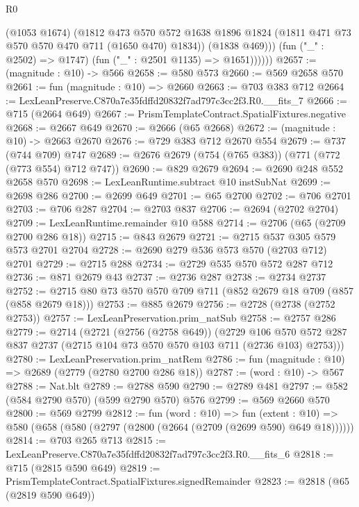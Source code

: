 \begin{lexlean}{R0}
\begin{coremodule}
                  (@1053 @1674)
                  (@1812
                    @473
                    @570
                    @572
                    @1638
                    @1896
                    @1824
                    (@1811 @471 @73 @570 @570 @470 @711 (@1650 @470) @1834))
                  (@1838 @469)))
              (fun ("_" : @2502) => @1747)
              (fun ("_" : @2501 @1135) => @1651))))))
@2657 := (magnitude : @10) -> @566
@2658 := @580 @573
@2660 := @569 @2658 @570
@2661 := fun (magnitude : @10) => @2660
@2663 := @703 @383 @712
@2664 := LexLeanPreserve.C870a7e35fdffd20832f7ad797c3cc2f3.R0.__fits_7
@2666 := @715 (@2664 @649)
@2667 := PrismTemplateContract.SpatialFixtures.negative
@2668 := @2667 @649
@2670 := @2666 (@65 @2668)
@2672 := (magnitude : @10) -> @2663 @2670
@2676 := @729 @383 @712 @2670 @554
@2679 := @737 (@744 @709) @747
@2689 := @2676 @2679 (@754 (@765 @383)) (@771 (@772 (@773 @554) @712 @747))
@2690 := @829 @2679
@2694 := @2690 @248 @552 @2658 @570
@2698 := LexLeanRuntime.subtract @10 instSubNat
@2699 := @2698 @286
@2700 := @2699 @649
@2701 := @65 @2700
@2702 := @706 @2701
@2703 := @706 @287
@2704 := @2703 @837
@2706 := @2694 (@2702 @2704)
@2709 := LexLeanRuntime.remainder @10 @588
@2714 := @2706 (@65 (@2709 @2700 @286 @18))
@2715 := @843 @2679
@2721 := @2715 @537 @305 @579 @573 @2701 @2704
@2728 := @2690 @279 @536 @573 @570 (@2703 @712) @2701
@2729 := @2715 @288
@2734 := @2729 @535 @570 @572 @287 @712
@2736 := @871 @2679 @43
@2737 := @2736 @287
@2738 := @2734 @2737
@2752 := @2715 @80 @73 @570 @570 @709 @711 (@852 @2679 @18 @709 (@857 (@858 @2679 @18)))
@2753 := @885 @2679
@2756 := @2728 (@2738 (@2752 @2753))
@2757 := LexLeanPreservation.prim_natSub
@2758 := @2757 @286
@2779 := @2714
    (@2721
      (@2756 (@2758 @649))
      (@2729
        @106
        @570
        @572
        @287
        @837
        @2737
        (@2715 @104 @73 @570 @570 @103 @711 (@2736 @103) @2753)))
@2780 := LexLeanPreservation.prim_natRem
@2786 := fun (magnitude : @10) => @2689 (@2779 (@2780 @2700 @286 @18))
@2787 := (word : @10) -> @567
@2788 := Nat.blt
@2789 := @2788 @590
@2790 := @2789 @481
@2797 := @582 (@584 @2790 @570) (@599 @2790 @570) @576
@2799 := @569 @2660 @570
@2800 := @569 @2799
@2812 := fun (word : @10) =>
  fun (extent : @10) => @580 (@658 (@580 (@2797 (@2800 (@2664 (@2709 (@2699 @590) @649 @18))))))
@2814 := @703 @265 @713
@2815 := LexLeanPreserve.C870a7e35fdffd20832f7ad797c3cc2f3.R0.__fits_6
@2818 := @715 (@2815 @590 @649)
@2819 := PrismTemplateContract.SpatialFixtures.signedRemainder
@2823 := @2818 (@65 (@2819 @590 @649))

\end{coremodule}
\end{lexlean}
